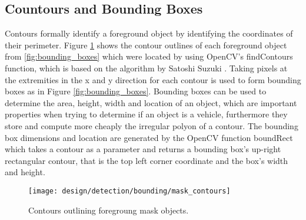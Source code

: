 
\subsection{Countours and Bounding Boxes}

Contours formally identify a foreground object by identifying the coordinates of their perimeter. Figure \ref{fig:contour_polygon} shows the contour outlines of each foreground object from \ref{fig:bounding_boxes} which were located by using OpenCV's findContours function, which is based on the algorithm by Satoshi Suzuki \cite{satoshi_findContours}. Taking pixels at the extremities in the x and y direction for each contour is used to form bounding boxes as in Figure \ref{fig:bounding_boxes}. Bounding boxes can be used to determine the area, height, width and location of an object, which are important properties when trying to determine if an object is a vehicle, furthermore they store and compute more cheaply the irregular polyon of a contour. The bounding box dimensions and location are generated by the OpenCV function boundRect which takes a contour as a parameter and returns a bounding box's up-right rectangular contour, that is the top left corner coordinate and the box's width and height. 

\begin{figure}[H]
    \centering
    \centering\texttt{[image: design/detection/bounding/mask\_contours]}
    \caption{Contours outlining foregroung mask objects.}
    \label{fig:contour_polygon}
\end{figure}
  
  
